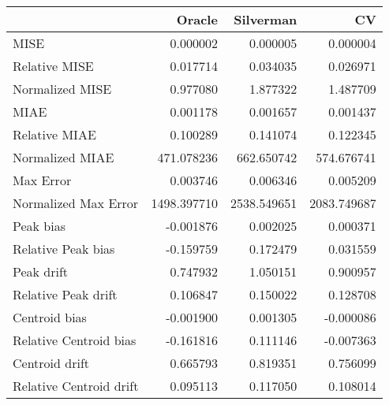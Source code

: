 \begin{tabular}{lrrr}
  \hline
 & Oracle & Silverman & CV \\ 
  \hline
MISE & 0.000002 & 0.000005 & 0.000004 \\ 
  Relative MISE & 0.017714 & 0.034035 & 0.026971 \\ 
  Normalized MISE & 0.977080 & 1.877322 & 1.487709 \\ 
  MIAE & 0.001178 & 0.001657 & 0.001437 \\ 
  Relative MIAE & 0.100289 & 0.141074 & 0.122345 \\ 
  Normalized MIAE & 471.078236 & 662.650742 & 574.676741 \\ 
  Max Error & 0.003746 & 0.006346 & 0.005209 \\ 
  Normalized Max Error & 1498.397710 & 2538.549651 & 2083.749687 \\ 
  Peak bias & -0.001876 & 0.002025 & 0.000371 \\ 
  Relative Peak bias & -0.159759 & 0.172479 & 0.031559 \\ 
  Peak drift & 0.747932 & 1.050151 & 0.900957 \\ 
  Relative Peak drift & 0.106847 & 0.150022 & 0.128708 \\ 
  Centroid bias & -0.001900 & 0.001305 & -0.000086 \\ 
  Relative Centroid bias & -0.161816 & 0.111146 & -0.007363 \\ 
  Centroid drift & 0.665793 & 0.819351 & 0.756099 \\ 
  Relative Centroid drift & 0.095113 & 0.117050 & 0.108014 \\ 
   \hline
\end{tabular}

